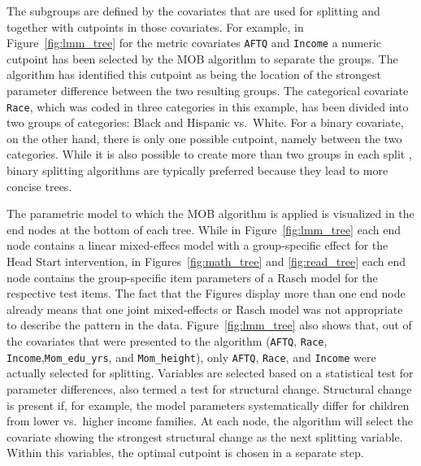 \documentclass[doc,floatsintext,natbib]{apa7}
\begin{document}
The subgroups are defined by the covariates that are used for splitting and together with cutpoints in those covariates. For example, in Figure~\ref{fig:lmm_tree} for the metric covariates \texttt{AFTQ} and \texttt{Income} a numeric cutpoint has been selected by the MOB algorithm to separate the groups. The algorithm has identified this cutpoint as being the location of the strongest parameter difference between the two resulting groups. The categorical covariate \texttt{Race}, which was coded in three categories in this example, has been divided into two groups of categories: Black and Hispanic vs.~White. For a binary covariate,  
on the other hand, there is only one possible cutpoint, namely between the two categories. While it is also possible to create more than two groups in each split \citep{KimLoh:2001,Qui:1993}, binary splitting algorithms are typically preferred because they lead to more concise trees. 

The parametric model to which the MOB algorithm is applied is visualized in the end nodes at the bottom of each tree. While in Figure~\ref{fig:lmm_tree} each end node contains a linear mixed-effecs model with a group-specific effect for the Head Start intervention, in Figures~\ref{fig:math_tree} and \ref{fig:read_tree} each end node contains the group-specific item parameters of a Rasch model for the respective test items. 
The fact that the Figures display more than one end node already means that one joint mixed-effects or Rasch model was not appropriate to describe the pattern in the data. Figure~\ref{fig:lmm_tree} also shows that, out of the  covariates that were presented to the algorithm (\texttt{AFTQ}, \texttt{Race}, \texttt{Income},\texttt{Mom\_edu\_yrs}, and \texttt{Mom\_height}), only \texttt{AFTQ}, \texttt{Race}, and \texttt{Income} were actually selected for splitting. Variables are selected based on a statistical test for parameter differences, also termed a test for structural change. Structural change is present if, for example, the model parameters systematically differ for children from lower vs.~higher income families. At each node, the algorithm will select the covariate showing the strongest structural change as the next splitting variable. Within this variables, the optimal cutpoint is chosen in a separate step.
\end{document}
